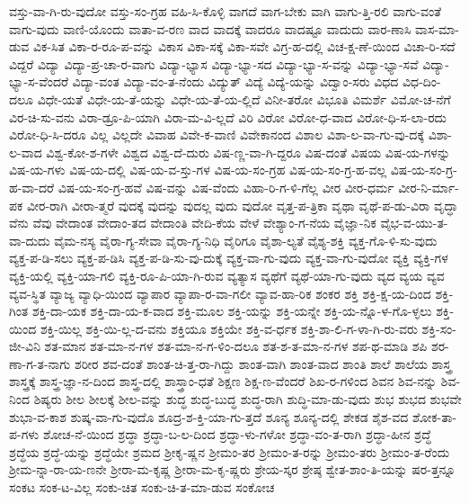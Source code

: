 {ವಸ್ತು-ವಾ-ಗಿ-ರು-ವುದೋ
ವಸ್ತು-ಸಂ-ಗ್ರಹ
ವಹಿ-ಸಿ-ಕೊಳ್ಳಿ
ವಾಗದೆ
ವಾಗ-ಬೇಕು
ವಾಗಿ
ವಾಗು-ತ್ತಿ-ರಲಿ
ವಾಗು-ವಂತೆ
ವಾಗು-ವುದು
ವಾಣಿ-ಯೊಂದು
ವಾತಾ-ವ-ರಣ
ವಾದ
ವಾದಕ್ಕೆ
ವಾದರೂ
ವಾದಷ್ಟೂ
ವಾದುದು
ವಾರ-ಣಾಸಿ
ವಾಸ-ಮಾ-ಡುವ
ವಿಕ-ಸಿತ
ವಿಕಾ-ರ-ರೂ-ಪ-ವನ್ನು
ವಿಕಾಸ
ವಿಕಾ-ಸಕ್ಕೆ
ವಿಕಾ-ಸವೇ
ವಿಗ್ರ-ಹ-ದಲ್ಲಿ
ವಿಚ-ಕ್ಷ-ಣೆ-ಯಿಂದ
ವಿಚಾ-ರಿ-ಸದೆ
ವಿದ್ದರೆ
ವಿದ್ಯಾ
ವಿದ್ಯಾ-ಪ್ರ-ಚಾ-ರ-ವಾಗು
ವಿದ್ಯಾ-ಭ್ಯಾಸ
ವಿದ್ಯಾ-ಭ್ಯಾ-ಸದ
ವಿದ್ಯಾ-ಭ್ಯಾ-ಸ-ವನ್ನು
ವಿದ್ಯಾ-ಭ್ಯಾ-ಸವೆ
ವಿದ್ಯಾ-ಭ್ಯಾ-ಸ-ವೆಂದರೆ
ವಿದ್ಯಾ-ವಂತ
ವಿದ್ಯಾ-ವಂ-ತ-ನೆಂದು
ವಿದ್ಯುತ್
ವಿದ್ಯೆ
ವಿದ್ಯೆ-ಯನ್ನು
ವಿದ್ವಾಂ-ಸರು
ವಿಧದ
ವಿಧ-ದಿಂ-ದಲೂ
ವಿಧೇ-ಯತೆ
ವಿಧೇ-ಯ-ತೆ-ಯನ್ನು
ವಿಧೇ-ಯ-ತೆ-ಯ-ಲ್ಲಿದೆ
ವಿನೀ-ತರೋ
ವಿಭೂತಿ
ವಿಮರ್ಶೆ
ವಿಮೋ-ಚ-ನೆಗೆ
ವಿರ-ಚಿ-ಸು-ವನು
ವಿರಾ-ಡ್ರೂ-ಪಿ-ಯಾಗಿ
ವಿರಾ-ಮ-ವಿ-ಲ್ಲದೆ
ವಿರಿ
ವಿರೋ
ವಿರೋ-ಧ-ವಾದ
ವಿರೋ-ಧಿ-ಸ-ಲಾ-ರದು
ವಿರೋ-ಧಿ-ಸಿ-ದರೂ
ವಿಲ್ಲ
ವಿಲ್ಲದೇ
ವಿವಾಹ
ವಿವೇ-ಕ-ವಾಣಿ
ವಿವೇಕಾನಂದ
ವಿಶಾಲ
ವಿಶಾ-ಲ-ವಾ-ಗು-ವು-ದಕ್ಕೆ
ವಿಶಾ-ಲ-ವಾದ
ವಿಶ್ವ-ಕೋ-ಶ-ಗಳೇ
ವಿಶ್ವದ
ವಿಶ್ವ-ದೆ-ದುರು
ವಿಷ-ಣ್ಣ-ವಾ-ಗಿ-ದ್ದರೂ
ವಿಷ-ದಂತೆ
ವಿಷಯ
ವಿಷ-ಯ-ಗಳನ್ನು
ವಿಷ-ಯ-ಗಳು
ವಿಷ-ಯ-ದಲ್ಲಿ
ವಿಷ-ಯ-ವ-ಸ್ತು-ಗಳ
ವಿಷ-ಯ-ಸಂ-ಗ್ರಹ
ವಿಷ-ಯ-ಸಂ-ಗ್ರ-ಹ-ವಲ್ಲ
ವಿಷ-ಯ-ಸಂ-ಗ್ರ-ಹ-ವಾ-ದರೆ
ವಿಷ-ಯ-ಸಂ-ಗ್ರ-ಹವೆ
ವಿಷ-ವನ್ನು
ವಿಷ-ವೆಂದು
ವಿಹಾ-ರಿ-ಗ-ಳಿ-ಗೆಲ್ಲ
ವೀರ
ವೀರ-ಧರ್ಮ
ವೀರ-ನಿ-ರ್ಮಾ-ಪಕ
ವೀರ-ರಾಗಿ
ವೀರಾ-ತ್ಮರೆ
ವುದಕ್ಕೆ
ವುದನ್ನು
ವುದಲ್ಲ
ವುದು
ವುದೋ
ವೃತ್ತ-ಪ-ತ್ರಿಕಾ
ವೃಥಾ
ವೃಥೆ-ಪ-ಡು-ವಿರಾ
ವೃದ್ಧಾ
ವೆನು
ವೆವು
ವೇದಾಂತ
ವೇದಾಂ-ತದ
ವೇದಾಂತಿ
ವೇದಿ-ಕೆಯ
ವೇಳೆ
ವೇಶ್ಯಾಂ-ಗ-ನೆಯ
ವೈಜ್ಞಾ-ನಿಕ
ವೈಭ-ವ-ಯು-ತ-ವಾ-ದುದು
ವೈಮ-ನಸ್ಯ
ವೈರಾ-ಗ್ಯ-ಸೇವಾ
ವೈರಾ-ಗ್ಯ-ನಿಧಿ
ವೈರಿಗೂ
ವೈಶಾ-ಲ್ಯತೆ
ವೈಶ್ಯ-ಶಕ್ತಿ
ವ್ಯಕ್ತ-ಗೊ-ಳಿ-ಸು-ವುದು
ವ್ಯಕ್ತ-ಪ-ಡಿ-ಸಲು
ವ್ಯಕ್ತ-ಪ-ಡಿಸಿ
ವ್ಯಕ್ತ-ಪ-ಡಿ-ಸು-ವು-ದುಕ್ಕೆ
ವ್ಯಕ್ತ-ವಾ-ಗು-ವುದು
ವ್ಯಕ್ತ-ವಾ-ಗು-ವುದೋ
ವ್ಯಕ್ತಿ
ವ್ಯಕ್ತಿ-ಗಳ
ವ್ಯಕ್ತಿ-ಯಲ್ಲಿ
ವ್ಯಕ್ತಿ-ಯಾ-ಗಲಿ
ವ್ಯಕ್ತಿ-ರೂ-ಪಿ-ಯಾ-ಗಿ-ರುವ
ವ್ಯತ್ಯಾಸ
ವ್ಯಥೆಗೆ
ವ್ಯಥೆ-ಯಾ-ಗು-ವುದು
ವ್ಯದ
ವ್ಯಯ
ವ್ಯವ
ವ್ಯವ-ಸ್ಥಿತ
ವ್ಯಾಜ್ಯ
ವ್ಯಾಧಿ-ಯಿಂದ
ವ್ಯಾಪಾರ
ವ್ಯಾಪಾ-ರ-ವಾ-ಗಲೀ
ವ್ಯಾವ-ಹಾ-ರಿಕ
ಶಂಕರ
ಶಕ್ತಿ
ಶಕ್ತಿ-ಕ್ಷ-ಯ-ದಿಂದ
ಶಕ್ತಿ-ಗಿಂತ
ಶಕ್ತಿ-ದಾ-ಯಕ
ಶಕ್ತಿ-ದಾ-ಯ-ಕ-ವಾದ
ಶಕ್ತಿ-ಮೂಲ
ಶಕ್ತಿ-ಯನ್ನು
ಶಕ್ತಿ-ಯನ್ನೇ
ಶಕ್ತಿ-ಯ-ನ್ನೊ-ಳ-ಗೊ-ಳ್ಳಲು
ಶಕ್ತಿ-ಯಿಂದ
ಶಕ್ತಿ-ಯಿಲ್ಲ
ಶಕ್ತಿ-ಯಿ-ಲ್ಲ-ದ-ವನು
ಶಕ್ತಿಯೂ
ಶಕ್ತಿಯೇ
ಶಕ್ತಿ-ವ-ರ್ಧಕ
ಶಕ್ತಿ-ಶಾ-ಲಿ-ಗ-ಳಾ-ಗಿ-ರು-ವರು
ಶಕ್ತಿ-ಸಂ-ಜೀ-ವಿನಿ
ಶತ-ಮಾನ
ಶತ-ಮಾ-ನ-ಗಳ
ಶತ-ಮಾ-ನ-ಗ-ಳಿಂ-ದಲೂ
ಶತ-ಶ-ತ-ಮಾ-ನ-ಗಳ
ಶಪ-ಥ-ಮಾಡಿ
ಶಪಿ
ಶರ-ಣಾ-ಗ-ತ-ನಾಗು
ಶರೀರ
ಶವ-ದಂತೆ
ಶಾಂತ-ಚಿ-ತ್ತ-ರಾ-ಗಿದ್ದು
ಶಾಂತ-ವಾಗಿ
ಶಾಂತ-ವಾದ
ಶಾಂತಿ
ಶಾಲೆ
ಶಾಲೆಯ
ಶಾಸ್ತ್ರ
ಶಾಸ್ತ್ರಕ್ಕೆ
ಶಾಸ್ತ್ರ-ಜ್ಞಾ-ನ-ದಿಂದ
ಶಾಸ್ತ್ರ-ದಲ್ಲಿ
ಶಾಸ್ತ್ರಾಂ-ಧತೆ
ಶಿಕ್ಷಣ
ಶಿಕ್ಷ-ಣ-ವೆಂದರೆ
ಶಿಖ-ರ-ಗಳಿಂದ
ಶಿವನ
ಶಿವ-ನನ್ನು
ಶಿವ-ನಿಂದ
ಶಿಷ್ಯರು
ಶೀಲ
ಶೀಲಕ್ಕೆ
ಶೀಲ-ವನ್ನು
ಶುದ್ಧ
ಶುದ್ಧ-ಬುದ್ಧ
ಶುದ್ಧ-ರಾಗಿ
ಶುದ್ಧಿ-ಮಾ-ಡು-ವುದು
ಶುಭ
ಶುಭದ
ಶುಭವೇ
ಶುಭಾ-ವ-ಕಾಶ
ಶುಷ್ಕ-ವಾ-ಗು-ವುದೊ
ಶೂದ್ರ-ಶ-ಕ್ತಿ-ಯಾ-ಗು-ತ್ತದೆ
ಶೂನ್ಯ
ಶೂನ್ಯ-ದಲ್ಲಿ
ಶೇಕಡ
ಶೈಶ-ವದ
ಶೋಕ-ತಾ-ಪ-ಗಳು
ಶೋಚ-ನೆ-ಯಿಂದ
ಶ್ರದ್ಧಾ
ಶ್ರದ್ಧಾ-ಬ-ಲ-ದಿಂದ
ಶ್ರದ್ಧಾ-ಳು-ಗಳೋ
ಶ್ರದ್ಧಾ-ವಂ-ತ-ರಾಗಿ
ಶ್ರದ್ಧಾ-ಹೀನ
ಶ್ರದ್ಧೆ
ಶ್ರದ್ಧೆಯ
ಶ್ರದ್ಧೆ-ಯನ್ನು
ಶ್ರದ್ಧೆಯೇ
ಶ್ರಮದ
ಶ್ರೀಕೃ-ಷ್ಣನ
ಶ್ರೀಮಂ-ತರ
ಶ್ರೀಮಂ-ತ-ರನ್ನು
ಶ್ರೀಮಂ-ತರು
ಶ್ರೀಮಂ-ತ-ರೆಂದು
ಶ್ರೀಮ-ನ್ನಾ-ರಾ-ಯ-ಣನೇ
ಶ್ರೀರಾ-ಮ-ಕೃಷ್ಣ
ಶ್ರೀರಾ-ಮ-ಕೃ-ಷ್ಣರು
ಶ್ರೇಯ-ಸ್ಕರ
ಶ್ರೇಷ್ಠ
ಶ್ವೇತ-ಶಾಂ-ತಿ-ಯನ್ನು
ಷರ-ತ್ತನ್ನೂ
ಸಂಕಟ
ಸಂಕ-ಟ-ವಿಲ್ಲ
ಸಂಕು-ಚಿತ
ಸಂಕು-ಚಿ-ತ-ಮಾ-ಡುವ
ಸಂಕೋಚ
}
